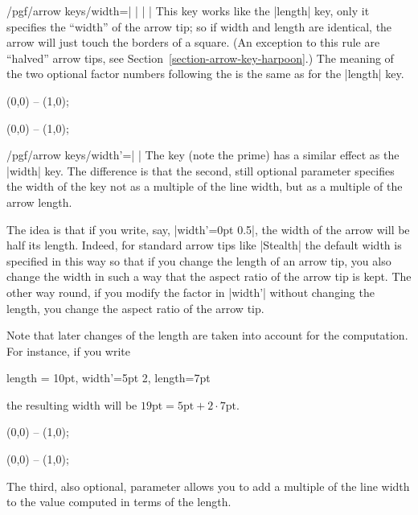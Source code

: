\begin{key}{/pgf/arrow keys/width=| |%
        | |}
    This key works like the |length| key, only it specifies the ``width'' of
    the arrow tip; so if width and length are identical, the arrow will just
    touch the borders of a square. (An exception to this rule are ``halved''
    arrow tips, see Section~\ref{section-arrow-key-harpoon}.) The meaning of
    the two optional factor numbers following the  is the same
    as for the |length| key.
\begin{codeexample}[preamble={\usetikzlibrary{arrows.meta}}]
\tikz \draw [arrows = {-Latex[width=10pt, length=10pt]}] (0,0) -- (1,0);
\end{codeexample}
\begin{codeexample}[preamble={\usetikzlibrary{arrows.meta}}]
\tikz \draw [arrows = {-Latex[width=0pt 10, length=10pt]}] (0,0) -- (1,0);
\end{codeexample}
\end{key}

\begin{key}{/pgf/arrow keys/width'=| |}
    The key (note the prime) has a similar effect as the |width| key. The
    difference is that the second, still optional parameter  specifies the width of the key not as a multiple of the line width,
    but as a multiple of the arrow length.

    The idea is that if you write, say, |width'=0pt 0.5|, the width of the
    arrow will be half its length. Indeed, for standard arrow tips like
    |Stealth| the default width is specified in this way so that if you change
    the length of an arrow tip, you also change the width in such a way that
    the aspect ratio of the arrow tip is kept. The other way round, if you
    modify the factor in |width'| without changing the length, you change the
    aspect ratio of the arrow tip.

    Note that later changes of the length are taken into account for the
    computation. For instance, if you write
\begin{codeexample}
length = 10pt, width'=5pt 2, length=7pt
\end{codeexample}
    the resulting width will be $19\mathrm{pt} = 5\mathrm{pt} + 2\cdot
    7\mathrm{pt}$.
\begin{codeexample}[preamble={\usetikzlibrary{arrows.meta}}]
\tikz \draw [arrows = {-Latex[width'=0pt .5, length=10pt]}] (0,0) -- (1,0);
\end{codeexample}
\begin{codeexample}[preamble={\usetikzlibrary{arrows.meta}}]
\tikz \draw [arrows = {-Latex[width'=0pt .5, length=15pt]}] (0,0) -- (1,0);
\end{codeexample}
    The third, also optional, parameter allows you to add a multiple of the
    line width to the value computed in terms of the length.
\end{key}



